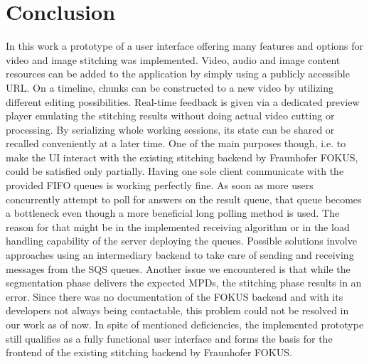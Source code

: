 \documentclass[conference]{IEEEtran}
\begin{document}
\section{Conclusion}
In this work a prototype of a user interface offering many features and options for video and image stitching was implemented.
Video, audio and image content resources can be added to the application by simply using a publicly accessible URL.
On a timeline, chunks can be constructed to a new video by utilizing different editing possibilities.
Real-time feedback is given via a dedicated preview player emulating the stitching results without doing actual video cutting or processing.
By serializing whole working sessions, its state can be shared or recalled conveniently at a later time.
One of the main purposes though, i.e. to make the UI interact with the existing stitching backend by Fraunhofer FOKUS, could be satisfied only partially.
Having one sole client communicate with the provided FIFO queues is working perfectly fine.
As soon as more users concurrently attempt to poll for answers on the result queue, that queue becomes a bottleneck even though a more beneficial long polling method is used.
The reason for that might be in the implemented receiving algorithm or in the load handling capability of the server deploying the queues.
Possible solutions involve approaches using an intermediary backend to take care of sending and receiving messages from the SQS queues.
Another issue we encountered is that while the segmentation phase delivers the expected MPDs, the stitching phase results in an error.
Since there was no documentation of the FOKUS backend and with its developers not always being contactable, this problem could not be resolved in our work as of now.
In spite of mentioned deficiencies, the implemented prototype still qualifies as a fully functional user interface and forms the basis for the frontend of the existing stitching backend by Fraunhofer FOKUS.
\end{document}
